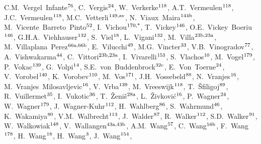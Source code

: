 \begin{flushleft}
C.M.~Vergel~Infante$^\textrm{\scriptsize 76}$,    
C.~Vergis$^\textrm{\scriptsize 24}$,    
W.~Verkerke$^\textrm{\scriptsize 118}$,    
A.T.~Vermeulen$^\textrm{\scriptsize 118}$,    
J.C.~Vermeulen$^\textrm{\scriptsize 118}$,    
M.C.~Vetterli$^\textrm{\scriptsize 149,av}$,    
N.~Viaux~Maira$^\textrm{\scriptsize 144b}$,    
M.~Vicente~Barreto~Pinto$^\textrm{\scriptsize 52}$,    
I.~Vichou$^\textrm{\scriptsize 170,*}$,    
T.~Vickey$^\textrm{\scriptsize 146}$,    
O.E.~Vickey~Boeriu$^\textrm{\scriptsize 146}$,    
G.H.A.~Viehhauser$^\textrm{\scriptsize 132}$,    
S.~Viel$^\textrm{\scriptsize 18}$,    
L.~Vigani$^\textrm{\scriptsize 132}$,    
M.~Villa$^\textrm{\scriptsize 23b,23a}$,    
M.~Villaplana~Perez$^\textrm{\scriptsize 66a,66b}$,    
E.~Vilucchi$^\textrm{\scriptsize 49}$,    
M.G.~Vincter$^\textrm{\scriptsize 33}$,    
V.B.~Vinogradov$^\textrm{\scriptsize 77}$,    
A.~Vishwakarma$^\textrm{\scriptsize 44}$,    
C.~Vittori$^\textrm{\scriptsize 23b,23a}$,    
I.~Vivarelli$^\textrm{\scriptsize 153}$,    
S.~Vlachos$^\textrm{\scriptsize 10}$,    
M.~Vogel$^\textrm{\scriptsize 179}$,    
P.~Vokac$^\textrm{\scriptsize 139}$,    
G.~Volpi$^\textrm{\scriptsize 14}$,    
S.E.~von~Buddenbrock$^\textrm{\scriptsize 32c}$,    
E.~Von~Toerne$^\textrm{\scriptsize 24}$,    
V.~Vorobel$^\textrm{\scriptsize 140}$,    
K.~Vorobev$^\textrm{\scriptsize 110}$,    
M.~Vos$^\textrm{\scriptsize 171}$,    
J.H.~Vossebeld$^\textrm{\scriptsize 88}$,    
N.~Vranjes$^\textrm{\scriptsize 16}$,    
M.~Vranjes~Milosavljevic$^\textrm{\scriptsize 16}$,    
V.~Vrba$^\textrm{\scriptsize 139}$,    
M.~Vreeswijk$^\textrm{\scriptsize 118}$,    
T.~\v{S}filigoj$^\textrm{\scriptsize 89}$,    
R.~Vuillermet$^\textrm{\scriptsize 35}$,    
I.~Vukotic$^\textrm{\scriptsize 36}$,    
T.~\v{Z}eni\v{s}$^\textrm{\scriptsize 28a}$,    
L.~\v{Z}ivkovi\'{c}$^\textrm{\scriptsize 16}$,    
P.~Wagner$^\textrm{\scriptsize 24}$,    
W.~Wagner$^\textrm{\scriptsize 179}$,    
J.~Wagner-Kuhr$^\textrm{\scriptsize 112}$,    
H.~Wahlberg$^\textrm{\scriptsize 86}$,    
S.~Wahrmund$^\textrm{\scriptsize 46}$,    
K.~Wakamiya$^\textrm{\scriptsize 80}$,    
V.M.~Walbrecht$^\textrm{\scriptsize 113}$,    
J.~Walder$^\textrm{\scriptsize 87}$,    
R.~Walker$^\textrm{\scriptsize 112}$,    
S.D.~Walker$^\textrm{\scriptsize 91}$,    
W.~Walkowiak$^\textrm{\scriptsize 148}$,    
V.~Wallangen$^\textrm{\scriptsize 43a,43b}$,    
A.M.~Wang$^\textrm{\scriptsize 57}$,    
C.~Wang$^\textrm{\scriptsize 58b}$,    
F.~Wang$^\textrm{\scriptsize 178}$,    
H.~Wang$^\textrm{\scriptsize 18}$,    
H.~Wang$^\textrm{\scriptsize 3}$,    
J.~Wang$^\textrm{\scriptsize 154}$,    

\end{flushleft}
